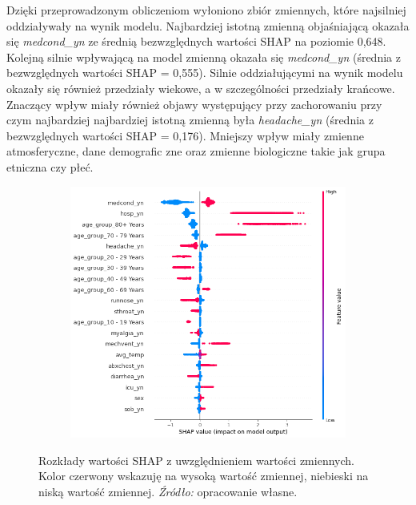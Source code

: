 \documentclass[polish, twoside, 12pt, a4paper]{article}
\theoremstyle{definition}
\theoremstyle{plain}
\theoremstyle{remark}
\begin{document}
Dzięki przeprowadzonym obliczeniom wyłoniono zbiór zmiennych, które najsilniej oddziaływały na wynik modelu. Najbardziej istotną zmienną objaśniającą okazała się \emph{medcond\_yn} ze średnią bezwzględnych wartości SHAP na poziomie 0,648. Kolejną silnie wpływającą na model zmienną okazała się \emph{medcond\_yn} (średnia z bezwzględnych wartości SHAP = 0,555). Silnie oddziałującymi na wynik modelu okazały się również przedziały wiekowe, a w szczególności przedziały krańcowe. Znaczący wpływ miały również objawy występujący przy zachorowaniu przy czym najbardziej najbardziej istotną zmienną była \emph{headache\_yn} (średnia z bezwzględnych wartości SHAP = 0,176). Mniejszy wpływ miały zmienne atmosferyczne, dane demografic
zne oraz zmienne biologiczne takie jak grupa etniczna czy płeć.


\begin{figure}[H]
  \centering
  \begin{subfigure}[t]{\textwidth}
	\centering
    \includegraphics[width=15cm]{shap_summary.png}
  \end{subfigure}
  \captionsetup{margin=10pt,font=small,labelfont=bf,width=.8\textwidth}
  \caption{Rozkłady wartości SHAP z uwzględnieniem wartości zmiennych. Kolor czerwony wskazuję na wysoką wartość zmiennej, niebieski na niską wartość zmiennej. \textit{Źródło:} opracowanie własne.}
\end{figure}
\end{document}
